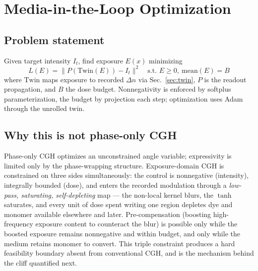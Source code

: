 \documentclass[conference]{IEEEtran}
\begin{document}
\section{Media-in-the-Loop Optimization}
\label{sec:opt}

\subsection{Problem statement}
Given target intensity $I_t$, find exposure $E(x)$ minimizing
\begin{equation}
L(E) = \| P(\mathrm{Twin}(E)) - I_t \|^2 \quad \text{s.t. } E \geq 0,\ \mathrm{mean}(E) = B
\end{equation}
where $\mathrm{Twin}$ maps exposure to recorded $\Delta n$ via
Sec.~\ref{sec:twin}, $P$ is the readout propagation, and $B$ the dose budget.
Nonnegativity is enforced by softplus parameterization, the budget by
projection each step; optimization uses Adam through the unrolled twin.

\subsection{Why this is not phase-only CGH}
Phase-only CGH optimizes an unconstrained angle variable; expressivity is
limited only by the phase-wrapping structure. Exposure-domain CGH is
constrained on three sides simultaneously: the control is nonnegative
(intensity), integrally bounded (dose), and enters the recorded modulation
through a \emph{low-pass, saturating, self-depleting} map — the non-local
kernel blurs, the $\tanh$ saturates, and every unit of dose spent writing one
region depletes dye and monomer available elsewhere and later.
Pre-compensation (boosting high-frequency exposure content to counteract the
blur) is possible only while the boosted exposure remains nonnegative and
within budget, and only while the medium retains monomer to convert. This
triple constraint produces a hard feasibility boundary absent from
conventional CGH, and is the mechanism behind the cliff quantified next.
\end{document}
